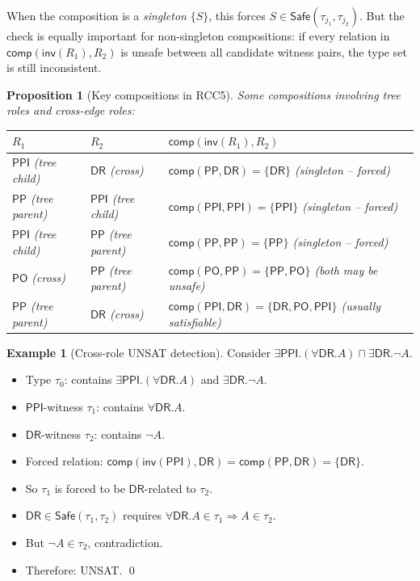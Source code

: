 \documentclass[a4paper,11pt]{article}
\newtheorem{proposition}[theorem]{Proposition}
\theoremstyle{definition}
\newtheorem{example}[theorem]{Example}
\newcommand{\DR}{\ensuremath{\mathsf{DR}}}
\newcommand{\PO}{\ensuremath{\mathsf{PO}}}
\newcommand{\PP}{\ensuremath{\mathsf{PP}}}
\newcommand{\PPI}{\ensuremath{\mathsf{PPI}}}
\newcommand{\inv}{\ensuremath{\mathsf{inv}}}
\newcommand{\comp}{\ensuremath{\mathsf{comp}}}
\newcommand{\Safe}{\ensuremath{\mathsf{Safe}}}
\begin{document}
When the composition is a \emph{singleton} $\{S\}$,
this forces $S \in \Safe(\tau_{j_1}, \tau_{j_2})$.
But the check is equally important for non-singleton
compositions: if every relation in
$\comp(\inv(R_1), R_2)$ is unsafe between
all candidate witness pairs, the type set is still
inconsistent.

\begin{proposition}[Key compositions in RCC5]
\label{prop:singletons}
Some compositions involving tree roles and cross-edge roles:
\begin{center}
\renewcommand{\arraystretch}{1.2}
\begin{tabular}{lll}
\toprule
$R_1$ & $R_2$ & $\comp(\inv(R_1), R_2)$ \\
\midrule
$\PPI$ (tree child) & $\DR$ (cross) &
  $\comp(\PP, \DR) = \{\DR\}$ \textit{(singleton -- forced)} \\
$\PP$ (tree parent) & $\PPI$ (tree child) &
  $\comp(\PPI, \PPI) = \{\PPI\}$ \textit{(singleton -- forced)} \\
$\PPI$ (tree child) & $\PP$ (tree parent) &
  $\comp(\PP, \PP) = \{\PP\}$ \textit{(singleton -- forced)} \\
$\PO$ (cross) & $\PP$ (tree parent) &
  $\comp(\PO, \PP) = \{\PP,\PO\}$ \textit{(both may be unsafe)} \\
$\PP$ (tree parent) & $\DR$ (cross) &
  $\comp(\PPI, \DR) = \{\DR,\PO,\PPI\}$ \textit{(usually satisfiable)} \\
\bottomrule
\end{tabular}
\end{center}
\end{proposition}

\begin{example}[Cross-role UNSAT detection]
\label{ex:cross-unsat}
Consider $\exists\PPI.(\forall\DR.A) \sqcap \exists\DR.\neg A$.
\begin{itemize}[nosep]
  \item Type $\tau_0$: contains $\exists\PPI.(\forall\DR.A)$ and
    $\exists\DR.\neg A$.
  \item $\PPI$-witness $\tau_1$: contains $\forall\DR.A$.
  \item $\DR$-witness $\tau_2$: contains $\neg A$.
  \item Forced relation:
    $\comp(\inv(\PPI), \DR) = \comp(\PP, \DR) = \{\DR\}$.
  \item So $\tau_1$ is forced to be $\DR$-related to $\tau_2$.
  \item $\DR \in \Safe(\tau_1, \tau_2)$ requires
    $\forall\DR.A \in \tau_1 \Rightarrow A \in \tau_2$.
  \item But $\neg A \in \tau_2$, contradiction.
  \item Therefore: UNSAT. \qed
\end{itemize}
\end{example}
\end{document}
